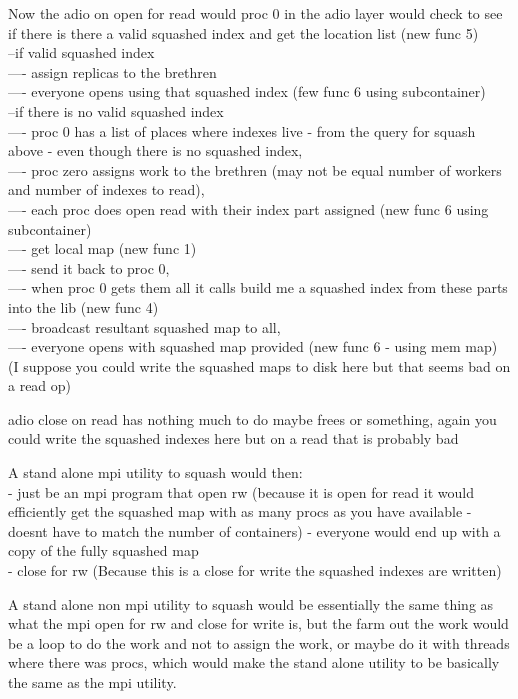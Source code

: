 Now the adio on open for read would
proc 0 in the adio layer would check to see if there
is there a valid squashed index and get the location list  (new func 5)
\\
--if valid squashed index
\\
----  assign replicas to the brethren
\\
---- everyone opens using that squashed index  (few func 6 using
subcontainer)
\\
--if there is no valid squashed index
\\
---- proc 0 has a list of places where indexes live - from the query for
squash above - even though there is no squashed index,
\\
---- proc zero assigns work to the brethren (may not be equal number of
workers and number of indexes to read),
\\
---- each proc does open read with their index part assigned (new func 6
using subcontainer)
\\
---- get local map (new func 1)
\\
---- send it back to proc 0,
\\
---- when proc 0 gets them all it calls build me a squashed index from
these parts into the lib (new func 4)
\\
---- broadcast resultant squashed map to all,
\\
---- everyone opens with squashed map provided (new func 6 - using mem
map) (I suppose you could write the squashed maps to disk here but that
seems bad on a read op)

adio close on read has nothing much to do maybe frees or something,
again you could write the squashed indexes here but on a read
that is probably bad

A stand alone mpi utility to squash would then:
\\
- just be an mpi program that open rw (because it is open for read it
would efficiently get the squashed map with as many procs as you have
available - doesnt have to match the number of containers) - everyone
would end up with a copy of the fully squashed map
\\
- close for rw  (Because this is a close for write the squashed indexes
are written)

A stand alone non mpi utility to squash would be essentially the same
thing as what the mpi open for rw and close for write is, but
the farm out the work would be a loop to do the work and not to assign
the work, or maybe do it with threads where there was procs, which
would make the stand alone utility to be basically the same as the mpi
utility.

